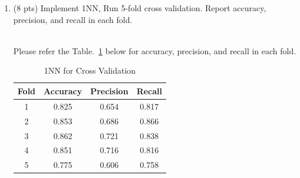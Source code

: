 \documentclass[a4paper]{article}
\theoremstyle{definition}
\newenvironment{soln}{
    \leavevmode\color{blue}\ignorespaces
}{}
\begin{document}
\begin{enumerate}
	\begin{itemize}
		\item Task: spam detection
		\item The number of rows: 5000
		\item The number of features: 3000 (Word frequency in each email)
		\item The label (y) column name: `Predictor'
		\item For a single training/test set split, use Email 1-4000 as the training set, Email 4001-5000 as the test set.
		\item For 5-fold cross validation, split dataset in the following way.
		\begin{itemize}
			\item Fold 1, test set: Email 1-1000, training set: the rest (Email 1001-5000)
			\item Fold 2, test set: Email 1000-2000, training set: the rest
			\item Fold 3, test set: Email 2000-3000, training set: the rest
			\item Fold 4, test set: Email 3000-4000, training set: the rest
			\item Fold 5, test set: Email 4000-5000, training set: the rest			
		\end{itemize}
	\end{itemize}
	
	\item (8 pts) Implement 1NN, Run 5-fold cross validation. Report accuracy, precision, and recall in each fold.
	
	\begin{soln}\\
	Please refer the Table.~\ref{tab:1nn} below for accuracy, precision, and recall in each fold.\\
	\begin{table}
		\centering
		\begin{tabular}{|c|c|c|c|}
			\hline
			Fold & Accuracy & Precision & Recall\\
			\hline
			1 & 0.825 & 0.654 & 0.817\\
			2 & 0.853 & 0.686 & 0.866\\
			3 & 0.862 & 0.721 & 0.838\\
			4 & 0.851 & 0.716 & 0.816\\
			5 & 0.775 & 0.606 & 0.758\\
			\hline
		\end{tabular}
		\caption{1NN for Cross Validation}
		\label{tab:1nn}
	\end{table}
	\end{soln}
	

\end{enumerate}
\end{document}

